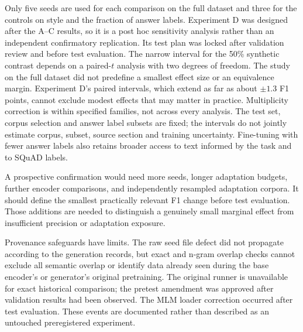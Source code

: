 \documentclass[pdflatex,sn-basic]{sn-jnl}
\begin{document}
Only five seeds are used for each comparison on the full dataset and three for
the controls on style and the fraction of answer labels. Experiment D was designed after the A--C
results, so it is a post hoc sensitivity analysis rather than an independent
confirmatory replication. Its test plan was locked after validation review and
before test evaluation. The narrow interval for the 50\% synthetic
contrast depends on a paired-\(t\) analysis with two degrees of freedom.
The study on the full dataset did not predefine a smallest effect size or an equivalence
margin. Experiment D's paired intervals, which extend as far as about $\pm1.3$ F1 points,
cannot exclude modest effects that may matter in practice.
Multiplicity correction is within specified families, not across every
analysis. The test set, corpus selection and answer label subsets
are fixed; the intervals do not jointly estimate corpus, subset, source section
and training uncertainty. Fine-tuning with fewer answer labels also retains broader
access to text informed by the task and to SQuAD labels.

A prospective confirmation would need more seeds, longer adaptation budgets,
further encoder comparisons, and independently resampled adaptation
corpora. It should define the smallest practically relevant F1 change before
test evaluation. Those additions are needed to distinguish a genuinely small
marginal effect from insufficient precision or adaptation exposure.

Provenance safeguards have limits. The raw seed file defect did not propagate
according to the generation records, but exact and n-gram overlap checks
cannot exclude all semantic overlap or identify data already seen during
the base encoder's or generator's original pretraining.
The original runner is unavailable for exact historical comparison; the
pretest amendment was approved after validation results had been observed.
The MLM loader correction occurred after test evaluation. These events are
documented rather than described as an untouched preregistered experiment.
\end{document}
